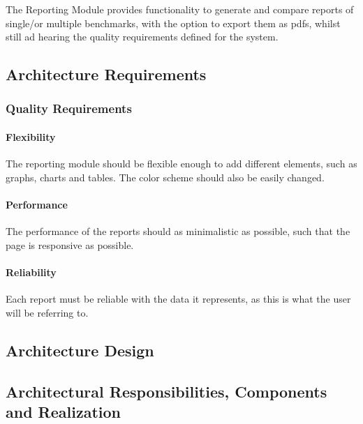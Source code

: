 The Reporting Module provides functionality to generate and compare reports
of single/or multiple benchmarks, with the option to export them as pdfs,
whilst still ad hearing the quality requirements defined for the system.

\subsection{Architecture Requirements}
\subsubsection{Quality Requirements}
\paragraph*{Flexibility}
The reporting module should be flexible enough to add different elements,
such as graphs, charts and tables. The color scheme should also be easily
changed.

\paragraph*{Performance}
The performance of the reports should as minimalistic as possible, such that the
page is responsive as possible.

\paragraph*{Reliability}
Each report must be reliable with the data it represents, as this is what the
user will be referring to.



\subsection{Architecture Design}
\subsection{Architectural Responsibilities, Components and Realization}
